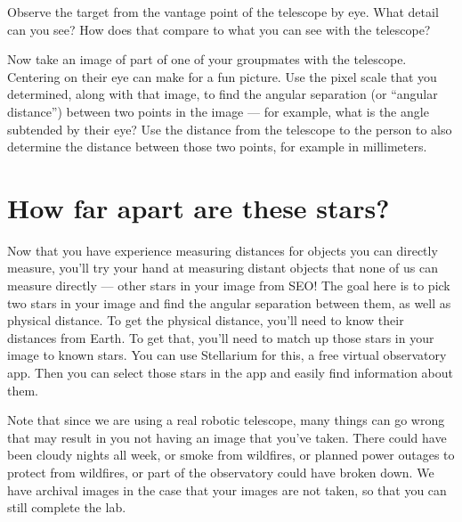 \begin{steps}
	\item Observe the target from the vantage
	point of the telescope by eye. What detail can you see? How does that compare to what
	you can see with the telescope?
	
	\item Now take an image of part of one of your groupmates with the telescope. Centering on their eye can make for a fun picture. Use the pixel scale that you determined, along with that image, to find the angular separation (or ``angular distance'') between two points in the image --- for example, what is the angle subtended by their eye? Use the distance from the telescope to the person to also determine the distance between those two points, for example in millimeters. %
\end{steps}

\section{How far apart are these stars?}

Now that you have experience measuring distances for objects you can directly measure, you'll try your hand at measuring distant objects that none of us can measure directly --- other stars in your image from SEO! The goal here is to pick two stars in your image and find the angular separation between them, as well as physical distance. To get the physical distance, you'll need to know their distances from Earth. To get that, you'll need to match up those stars in your image to known stars. You can use Stellarium for this, a free virtual observatory app. Then you can select those stars in the app and easily find information about them.

Note that since we are using a real robotic telescope, many things can go wrong that may result in you not having an image that you've taken. There could have been cloudy nights all week, or smoke from wildfires, or planned power outages to protect from wildfires, or part of the observatory could have broken down. We have archival images in the case that your images are not taken, so that you can still complete the lab.

